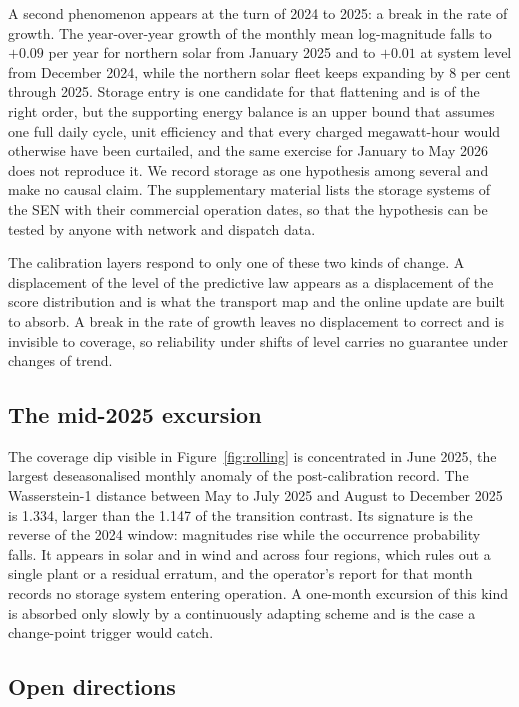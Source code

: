A second phenomenon appears at the turn of 2024 to 2025: a break in the rate of growth. The year-over-year growth of the monthly mean log-magnitude falls to $+0.09$ per year for northern solar from January 2025 and to $+0.01$ at system level from December 2024, while the northern solar fleet keeps expanding by 8 per cent through 2025. Storage entry is one candidate for that flattening and is of the right order, but the supporting energy balance is an upper bound that assumes one full daily cycle, unit efficiency and that every charged megawatt-hour would otherwise have been curtailed, and the same exercise for January to May 2026 does not reproduce it. We record storage as one hypothesis among several and make no causal claim. The supplementary material lists the storage systems of the SEN with their commercial operation dates, so that the hypothesis can be tested by anyone with network and dispatch data.

The calibration layers respond to only one of these two kinds of change. A displacement of the level of the predictive law appears as a displacement of the score distribution and is what the transport map and the online update are built to absorb. A break in the rate of growth leaves no displacement to correct and is invisible to coverage, so reliability under shifts of level carries no guarantee under changes of trend.

\subsection{The mid-2025 excursion}
\label{sec:excursion}

The coverage dip visible in Figure~\ref{fig:rolling} is concentrated in June 2025, the largest deseasonalised monthly anomaly of the post-calibration record. The Wasserstein-1 distance between May to July 2025 and August to December 2025 is 1.334, larger than the 1.147 of the transition contrast. Its signature is the reverse of the 2024 window: magnitudes rise while the occurrence probability falls. It appears in solar and in wind and across four regions, which rules out a single plant or a residual erratum, and the operator's report for that month records no storage system entering operation. A one-month excursion of this kind is absorbed only slowly by a continuously adapting scheme and is the case a change-point trigger would catch.

\subsection{Open directions}
\label{sec:direcciones}

